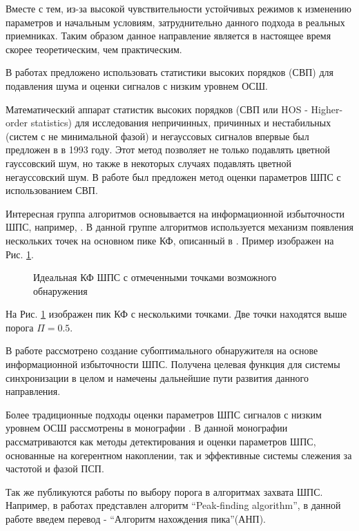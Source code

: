 Вместе с тем, из-за высокой чувствительности устойчивых режимов к изменению параметров и начальным условиям, затруднительно данного подхода
в реальных приемниках. Таким образом данное направление является в настоящее время скорее теоретическим, чем практическим.

В работах \cite{hos_petropulu, hos_zhao} предложено использовать статистики высоких порядков (СВП) для подавления шума и оценки
сигналов с низким уровнем ОСШ.

Математический аппарат статистик высоких порядков (СВП или HOS - Higher-order statistics)
для исследования непричинных, причинных и нестабильных
(систем с не минимальной фазой) и негауссовых сигналов впервые был предложен в \cite{hos_petropulu} в 1993 году.
Этот метод позволяет не только подавлять цветной гауссовский шум, но также в некоторых случаях подавлять
цветной негауссовский шум. В работе \cite{hos_zhao} был предложен метод оценки параметров ШПС с использованием СВП.

Интересная группа алгоритмов основывается на информационной избыточности ШПС, например, \cite{phd_che}. В данной
группе алгоритмов используется механизм появления нескольких точек на основном пике КФ, описанный в \cite{kaplan}. Пример
изображен на Рис. \ref{pic:sec1_peak_tcd}.
\begin{figure}[h]
	\center{}
	\caption{Идеальная КФ ШПС с отмеченными точками возможного обнаружения}
	\label{pic:sec1_peak_tcd}
\end{figure}

На Рис. \ref{pic:sec1_peak_tcd} изображен пик КФ с несколькими точками. Две точки находятся выше порога ${\Pi=0.5}$.

В работе \cite{phd_che} рассмотрено создание субоптимального обнаружителя на основе информационной избыточности ШПС.
Получена целевая функция для системы синхронизации в целом и намечены дальнейшие пути развития данного направления.

Более традиционные подходы оценки параметров ШПС сигналов с низким уровнем ОСШ рассмотрены в монографии \cite{ziedan-book}.
В данной монографии рассматриваются как методы детектирования и оценки параметров ШПС, основанные на когерентном накоплении, так и эффективные
системы слежения за частотой и фазой ПСП.

Так же публикуются работы по выбору порога в алгоритмах захвата ШПС. Например, в работах \cite{2max_ieee, 2max_article} представлен алгоритм
\textquotedblleft{Peak-finding algorithm}\textquotedblright,
в данной работе введем перевод -
\textquotedblleft{Алгоритм нахождения пика}\textquotedblright (АНП). 


